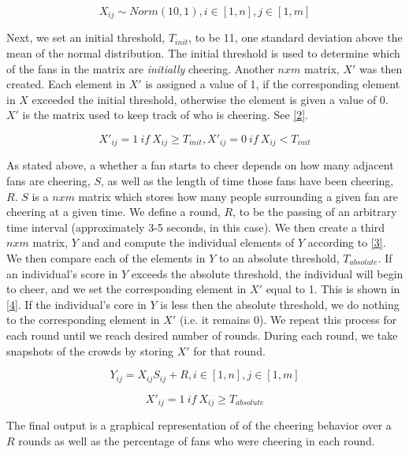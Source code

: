 \documentclass[oneside,12pt]{report}
\begin{document}
\begin{equation}
X_{ij}\sim Norm(10,1), i\in[1,n], j\in[1,m]
\label{1}
\end{equation}

Next, we set an initial threshold, $T_{init}$, to be 11, one standard deviation above the mean of the normal distribution. The initial threshold is used to determine which of the fans in the matrix are \textit{initially} cheering. Another $nxm$ matrix, $X'$ was then created. Each element in $X'$ is assigned a value of 1, if the corresponding element in $X$ exceeded the initial threshold, otherwise the element is given a value of 0. $X'$ is the matrix used to keep track of who is cheering. See \ref{2}.

\begin{equation}
X'_{ij}=1~if~X_{ij}\geq T_{init}, X'_{ij}=0~if~X_{ij}<T_{init}
\label{2}
\end{equation}

As stated above, a whether a fan starts to cheer depends on how many adjacent fans are cheering, $S$, as well as the length of time those fans have been cheering, $R$. $S$ is a $nxm$ matrix which stores how many people surrounding a given fan are cheering at a given time. We define a round, $R$, to be the passing of an arbitrary time interval (approximately 3-5 seconds, in this case). We then create a third $nxm$ matrix, $Y$ and and compute the individual elements of $Y$ according to \ref{3}. We then compare each of the elements in $Y$ to an absolute threshold, $T_{absolute}$. If an individual's score in $Y$ exceeds the absolute threshold, the individual will begin to cheer, and we set the corresponding element in $X'$ equal to 1.  This is shown in \ref{4}. If the individual's core in $Y$ is less then the absolute threshold, we do nothing to the corresponding element in $X'$ (i.e. it remains 0). We repeat this process for each round until we reach desired number of rounds. During each round, we take snapshots of the crowds by storing $X'$ for that round. 

\begin{equation}
Y_{ij}=X_{ij}S_{ij}+R, i\in[1,n], j\in[1,m]
\label{3}
\end{equation}

\begin{equation}
X'_{ij}=1~if~X_{ij}\geq T_{absolute}
\label{4}
\end{equation}

The final output is a graphical representation of of the cheering behavior over a $R$ rounds as well as the percentage of fans who were cheering in each round.
\end{document}
